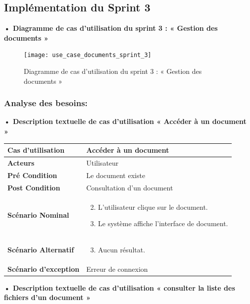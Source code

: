 \subsection{Implémentation du Sprint 3}
\textbf{•	Diagramme de cas d'utilisation du sprint 3 : « Gestion des documents »}

\begin{figure}[H]
  \centering
  \texttt{[image: use\_case\_documents\_sprint\_3]}
  \caption{Diagramme de cas d'utilisation du sprint 3 : « Gestion des documents »}
  \label{fig:UseCaseDiagramSprint3}
\end{figure}


\subsubsection{Analyse des besoins:}
\textbf{•	Description textuelle de cas d'utilisation « Accéder à un document »}

\begin{longtable}{|p{5cm}|p{10cm}|}
\hline
\textbf{Cas d'utilisation}&Accéder à un document\\
\hline
\textbf{Acteurs}&Utilisateur\\
\hline
\textbf{Pré Condition}&Le document existe\\
\hline
\textbf{Post Condition}&Consultation d'un document\\
\hline
\textbf{Scénario Nominal}&
\vspace{-\baselineskip}
\begin{enumerate}
    \setcounter{enumi}{1}
    \item L'utilisateur clique sur le document.
    \item Le système affiche l'interface de document.
    
\end{enumerate}\\
\hline
\textbf{Scénario Alternatif}&
\vspace{-\baselineskip}
\begin{enumerate}
    \setcounter{enumi}{2}
    \item Aucun résultat.
\end{enumerate}\\
\hline
\textbf{Scénario d'exception}&Erreur de connexion\\
\hline
\end{longtable}


\textbf{•	Description textuelle de cas d'utilisation « consulter la liste des fichiers d'un document »}


